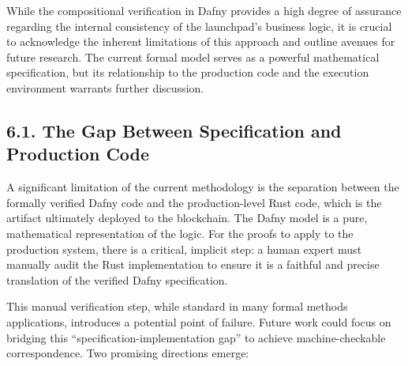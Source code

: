 \documentclass[
  english,
  onecolumn]{article}
\begin{document}
While the compositional verification in Dafny provides a high degree of
assurance regarding the internal consistency of the launchpad's business
logic, it is crucial to acknowledge the inherent limitations of this
approach and outline avenues for future research. The current formal
model serves as a powerful mathematical specification, but its
relationship to the production code and the execution environment
warrants further discussion.

\subsection{6.1. The Gap Between Specification and Production
Code}\label{the-gap-between-specification-and-production-code}

A significant limitation of the current methodology is the separation
between the formally verified Dafny code and the production-level Rust
code, which is the artifact ultimately deployed to the blockchain. The
Dafny model is a pure, mathematical representation of the logic. For the
proofs to apply to the production system, there is a critical, implicit
step: a human expert must manually audit the Rust implementation to
ensure it is a faithful and precise translation of the verified Dafny
specification.

This manual verification step, while standard in many formal methods
applications, introduces a potential point of failure. Future work could
focus on bridging this ``specification-implementation gap'' to achieve
machine-checkable correspondence. Two promising directions emerge:
\end{document}
